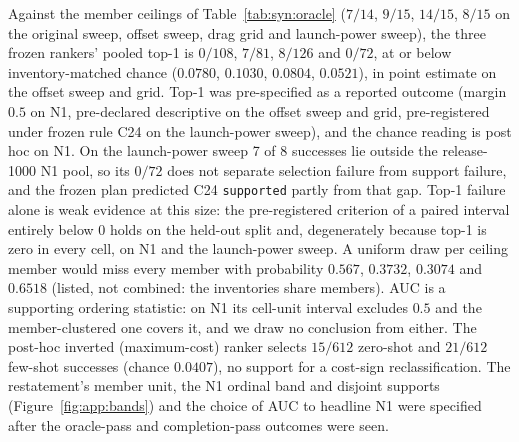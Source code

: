 Against the member ceilings of Table~\ref{tab:syn:oracle} ($7/14$, $9/15$, $14/15$, $8/15$ on the original sweep, offset sweep, drag grid and launch-power sweep), the three frozen rankers' pooled top-1 is $0/108$, $7/81$, $8/126$ and $0/72$, at or below inventory-matched chance ($0.0780$, $0.1030$, $0.0804$, $0.0521$), in point estimate on the offset sweep and grid. Top-1 was pre-specified as a reported outcome (margin $0.5$ on N1, pre-declared descriptive on the offset sweep and grid, pre-registered under frozen rule C24 on the launch-power sweep), and the chance reading is post hoc on N1. On the launch-power sweep 7 of 8 successes lie outside the release-1000 N1 pool, so its $0/72$ does not separate selection failure from support failure, and the frozen plan predicted C24 \texttt{supported} partly from that gap. Top-1 failure alone is weak evidence at this size: the pre-registered criterion of a paired interval entirely below $0$ holds on the held-out split and, degenerately because top-1 is zero in every cell, on N1 and the launch-power sweep. A uniform draw per ceiling member would miss every member with probability $0.567$, $0.3732$, $0.3074$ and $0.6518$ (listed, not combined: the inventories share members). %
AUC is a supporting ordering statistic: on N1 its cell-unit interval excludes $0.5$ and the member-clustered one covers it, and we draw no conclusion from either. The post-hoc inverted (maximum-cost) ranker selects $15/612$ zero-shot and $21/612$ few-shot successes (chance $0.0407$), no support for a cost-sign reclassification. The restatement's member unit, the N1 ordinal band and disjoint supports (Figure~\ref{fig:app:bands}) and the choice of AUC to headline N1 were specified after the oracle-pass and completion-pass outcomes were seen. %

